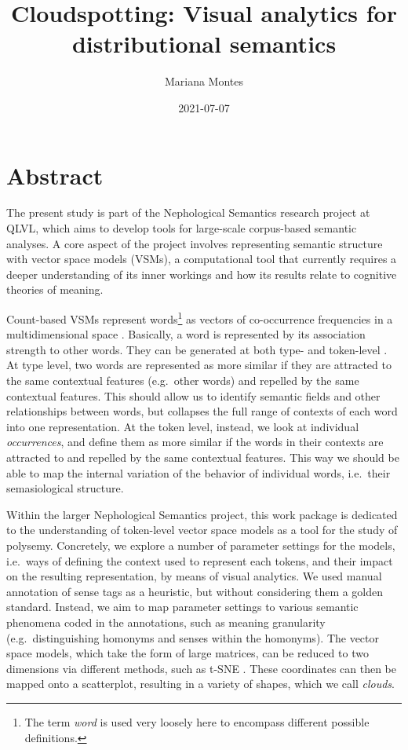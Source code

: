 \documentclass[
]{book}
\title{Cloudspotting: Visual analytics for distributional semantics}
\author{Mariana Montes}
\date{2021-07-07}
\begin{document}
\maketitle

{
\setcounter{tocdepth}{1}
\tableofcontents
}
\hypertarget{abstract}{%
\chapter*{Abstract}\label{abstract}}

The present study is part of the Nephological Semantics research project at QLVL,
which aims to develop tools for large-scale corpus-based semantic analyses.
A core aspect of the project involves representing semantic structure with vector space models (VSMs),
a computational tool that currently requires a deeper understanding of its inner workings
and how its results relate to cognitive theories of meaning.

Count-based VSMs represent words\footnote{The term \emph{word} is used very loosely here to encompass different possible definitions.} as vectors of co-occurrence frequencies in a multidimensional space
\autocite{turney.pantel_2010,lenci_2018}. Basically, a word is represented by
its association strength to other words.
They can be generated at both type- and token-level \autocite{heylen.etal_2012,heylen.etal_2015,depascale_2019}.
At type level, two words are represented as more similar if they are attracted to the same
contextual features (e.g.~other words) and repelled by the same contextual features. This should
allow us to identify semantic fields and other relationships between words, but collapses the full
range of contexts of each word into one representation.
At the token level, instead, we look at individual \emph{occurrences}, and define them as more similar if
the words in their contexts are attracted to and repelled by the same contextual features.
This way we should be able to map the internal variation of the behavior of individual words,
i.e.~their semasiological structure.

Within the larger Nephological Semantics project, this work package is dedicated
to the understanding of token-level vector space models as a tool
for the study of polysemy. Concretely, we explore a number of parameter settings for the models,
i.e.~ways of defining the context used to represent each tokens, and their impact on the
resulting representation, by means of visual analytics.
We used manual annotation of sense tags as a heuristic, but without
considering them a golden standard. Instead, we aim to map parameter settings to various
semantic phenomena coded in the annotations, such as
meaning granularity (e.g.~distinguishing homonyms and senses within the homonyms).
The vector space models, which take the form of large matrices,
can be reduced to two dimensions via different methods,
such as t-SNE \autocite{Rtsne2008,Rtsne2014}.
These coordinates can then be mapped onto a scatterplot, resulting in a variety of
shapes, which we call \emph{clouds}.
\end{document}
